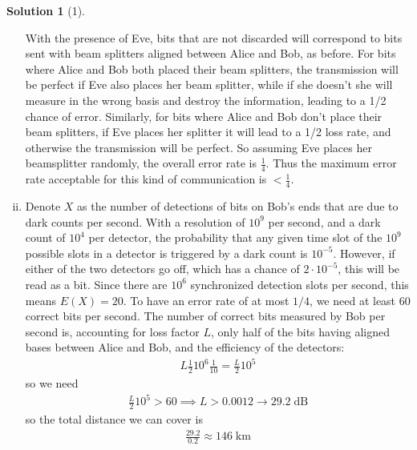 \documentclass[11pt]{article}
\theoremstyle{definition}
\newtheorem*{solution}{Solution}
\newcommand{\eq}{\begin{equation}\begin{aligned}}
\newcommand{\qe}{\end{aligned}\end{equation}}
\newcommand{\ket}[1]{|#1\rangle}
\begin{document}
\begin{solution}[1]
\begin{enumerate}[(i)]
    With the presence of Eve, bits that are not discarded will correspond to bits sent with beam splitters aligned between Alice and Bob, as before. For bits where Alice and Bob both placed their beam splitters, the transmission will be perfect if Eve also places her beam splitter, while if she doesn't she will measure in the wrong basis and destroy the information, leading to a 1/2 chance of error. Similarly, for bits where Alice and Bob don't place their beam splitters, if Eve places her splitter it will lead to a 1/2 loss rate, and otherwise the transmission will be perfect. So assuming Eve places her beamsplitter randomly, the overall error rate is $\boxed{\frac{1}{4}}$. Thus the maximum error rate acceptable for this kind of communication is $\boxed{<\frac{1}{4}}$.
    \item Denote $X$ as the number of detections of bits on Bob's ends that are due to dark counts per second. With a resolution of $10^9$ per second, and a dark count of $10^4$ per detector, the probability that any given time slot of the $10^9$ possible slots in a detector is triggered by a dark count is $10^{-5}$. However, if either of the two detectors go off, which has a chance of $2\cdot 10^{-5}$, this will be read as a bit. Since there are $10^6$ synchronized detection slots per second, this means $E(X)=20$. To have an error rate of at most $1/4$, we need at least 60 correct bits per second. The number of correct bits measured by Bob per second is, accounting for loss factor $L$, only half of the bits having aligned bases between Alice and Bob, and the efficiency of the detectors:
    \eq
      L\frac{1}{2}10^6\frac{1}{10}=\frac{L}{2}10^5
    \qe
    so we need
    \eq
      \frac{L}{2}10^5>60\implies L>0.0012\to 29.2 \;\text{dB}
    \qe
    so the total distance we can cover is
    \eq
      \frac{29.2}{0.2}\approx\boxed{146\;\text{km}}
    \qe
  \end{enumerate}
\end{solution}
\end{document}
